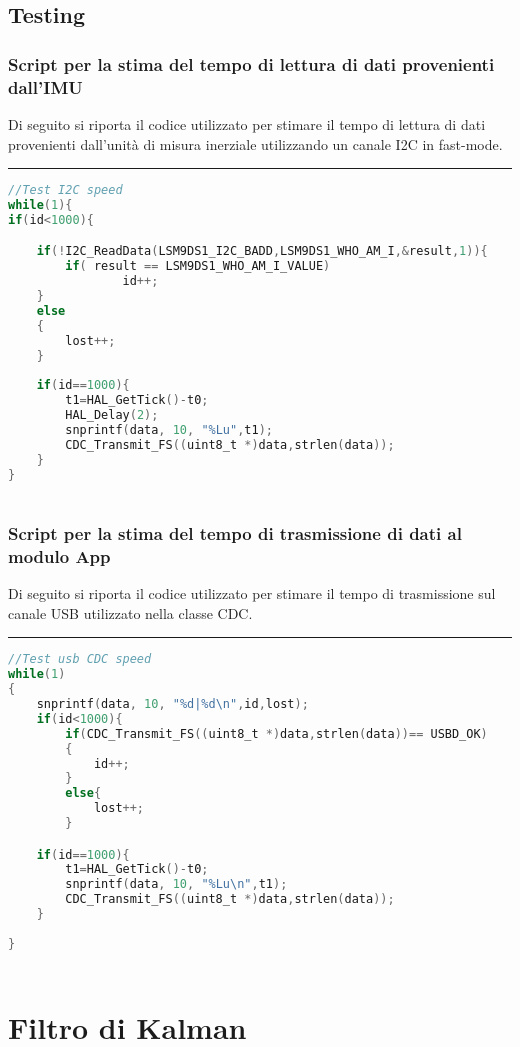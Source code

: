 \section{Testing}
\subsection{Script per la stima del tempo di lettura di dati provenienti dall'IMU }
\label{app:stimai2c}
Di seguito si riporta il codice utilizzato per stimare il tempo di lettura di dati provenienti dall'unità di misura inerziale utilizzando un canale I2C in fast-mode.\\
\noindent\rule{14.1cm}{0.4pt}
\begin{lstlisting}[language=C]
//Test I2C speed
while(1){
if(id<1000){

	if(!I2C_ReadData(LSM9DS1_I2C_BADD,LSM9DS1_WHO_AM_I,&result,1)){
		if( result == LSM9DS1_WHO_AM_I_VALUE)
				id++;
	}
	else
	{
		lost++;
	}
	
 	if(id==1000){
		t1=HAL_GetTick()-t0;
		HAL_Delay(2);
		snprintf(data, 10, "%Lu",t1);
		CDC_Transmit_FS((uint8_t *)data,strlen(data));
	}
}



\end{lstlisting}


\subsection{Script per la stima del tempo di trasmissione di dati al modulo App}
\label{app:stimausb}
Di seguito si riporta il codice utilizzato per stimare il tempo di trasmissione sul canale USB utilizzato nella classe CDC.\\
\noindent\rule{14.1cm}{0.4pt}

\begin{lstlisting}[language=C]
 //Test usb CDC speed
while(1)
{
	snprintf(data, 10, "%d|%d\n",id,lost);
	if(id<1000){
		if(CDC_Transmit_FS((uint8_t *)data,strlen(data))== USBD_OK)
		{
			id++;
		}
		else{
			lost++;
		}

	if(id==1000){
		t1=HAL_GetTick()-t0;
		snprintf(data, 10, "%Lu\n",t1);
		CDC_Transmit_FS((uint8_t *)data,strlen(data));
	}
	
}



\end{lstlisting}


\chapter{Filtro di Kalman}


\label{appendixKalman}
